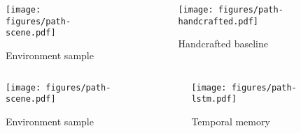 \begin{frame}
    \begin{columns}
        \begin{column}{0.5\textwidth}
            \begin{figure}
                \centering
                \texttt{[image: figures/path-scene.pdf]}
                \par Environment sample
            \end{figure}
        \end{column}
        \begin{column}{0.5\textwidth}
            \begin{figure}
                \centering
                \texttt{[image: figures/path-handcrafted.pdf]}
                \par Handcrafted baseline
            \end{figure}
        \end{column}
    \end{columns}
\end{frame}

\begin{frame}
    \begin{columns}
        \begin{column}{0.5\textwidth}
            \begin{figure}
                \centering
                \texttt{[image: figures/path-scene.pdf]}
                \par Environment sample
            \end{figure}
        \end{column}
        \begin{column}{0.5\textwidth}
            \begin{figure}
                \centering
                \texttt{[image: figures/path-lstm.pdf]}
                \par Temporal memory
            \end{figure}
        \end{column}
    \end{columns}
\end{frame}

